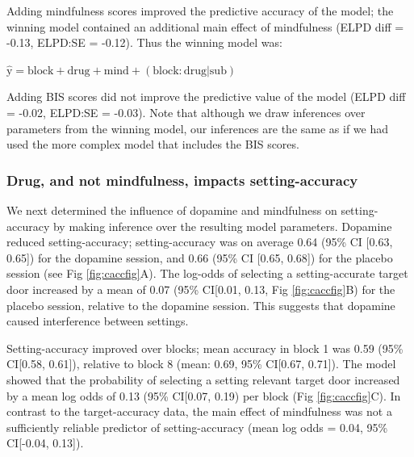 \documentclass[
  man]{apa6}
\begin{document}
Adding mindfulness scores improved the predictive accuracy of the model; the winning model contained an additional main effect of mindfulness (ELPD diff = -0.13, ELPD:SE = -0.12). Thus the winning model was:

\(\mathrm{\hat{y}} = \mathrm{block} + \mathrm{drug} + \mathrm{mind} + \mathrm{(block:drug|sub)}\)

Adding BIS scores did not improve the predictive value of the model (ELPD diff = -0.02, ELPD:SE = -0.03). Note that although we draw inferences over parameters from the winning model, our inferences are the same as if we had used the more complex model that includes the BIS scores.

\hypertarget{drug-and-not-mindfulness-impacts-setting-accuracy}{%
\subsubsection{Drug, and not mindfulness, impacts setting-accuracy}\label{drug-and-not-mindfulness-impacts-setting-accuracy}}

We next determined the influence of dopamine and mindfulness on setting-accuracy by making inference over the resulting model parameters. Dopamine reduced setting-accuracy; setting-accuracy was on average 0.64 (95\% CI {[}0.63, 0.65{]}) for the dopamine session, and 0.66 (95\% CI {[}0.65, 0.68{]}) for the placebo session (see Fig \ref{fig:caccfig}A). The log-odds of selecting a setting-accurate target door increased by a mean of 0.07 (95\% CI{[}0.01, 0.13, Fig \ref{fig:caccfig}B) for the placebo session, relative to the dopamine session. This suggests that dopamine caused interference between settings.

Setting-accuracy improved over blocks; mean accuracy in block 1 was 0.59 (95\% CI{[}0.58, 0.61{]}), relative to block 8 (mean: 0.69, 95\% CI{[}0.67, 0.71{]}). The model showed that the probability of selecting a setting relevant target door increased by a mean log odds of 0.13 (95\% CI{[}0.07, 0.19) per block (Fig \ref{fig:caccfig}C). In contrast to the target-accuracy data, the main effect of mindfulness was not a sufficiently reliable predictor of setting-accuracy (mean log odds = 0.04, 95\% CI{[}-0.04, 0.13{]}).
\end{document}
